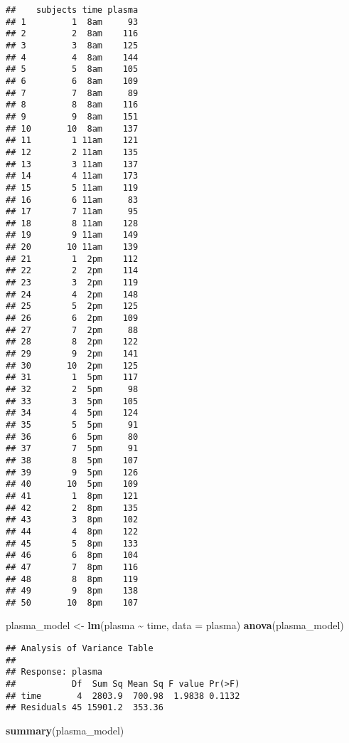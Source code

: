 \documentclass[
]{article}
\newenvironment{Shaded}{\begin{snugshade}}{\end{snugshade}}
\newcommand{\AttributeTok}[1]{\textcolor[rgb]{0.13,0.29,0.53}{#1}}
\newcommand{\FunctionTok}[1]{\textcolor[rgb]{0.13,0.29,0.53}{\textbf{#1}}}
\newcommand{\NormalTok}[1]{#1}
\newcommand{\OtherTok}[1]{\textcolor[rgb]{0.56,0.35,0.01}{#1}}
\newcommand{\SpecialCharTok}[1]{\textcolor[rgb]{0.81,0.36,0.00}{\textbf{#1}}}
\begin{document}
\begin{verbatim}
##    subjects time plasma
## 1         1  8am     93
## 2         2  8am    116
## 3         3  8am    125
## 4         4  8am    144
## 5         5  8am    105
## 6         6  8am    109
## 7         7  8am     89
## 8         8  8am    116
## 9         9  8am    151
## 10       10  8am    137
## 11        1 11am    121
## 12        2 11am    135
## 13        3 11am    137
## 14        4 11am    173
## 15        5 11am    119
## 16        6 11am     83
## 17        7 11am     95
## 18        8 11am    128
## 19        9 11am    149
## 20       10 11am    139
## 21        1  2pm    112
## 22        2  2pm    114
## 23        3  2pm    119
## 24        4  2pm    148
## 25        5  2pm    125
## 26        6  2pm    109
## 27        7  2pm     88
## 28        8  2pm    122
## 29        9  2pm    141
## 30       10  2pm    125
## 31        1  5pm    117
## 32        2  5pm     98
## 33        3  5pm    105
## 34        4  5pm    124
## 35        5  5pm     91
## 36        6  5pm     80
## 37        7  5pm     91
## 38        8  5pm    107
## 39        9  5pm    126
## 40       10  5pm    109
## 41        1  8pm    121
## 42        2  8pm    135
## 43        3  8pm    102
## 44        4  8pm    122
## 45        5  8pm    133
## 46        6  8pm    104
## 47        7  8pm    116
## 48        8  8pm    119
## 49        9  8pm    138
## 50       10  8pm    107
\end{verbatim}

\begin{Shaded}
\begin{Highlighting}[]
\NormalTok{plasma\_model }\OtherTok{\textless{}{-}} \FunctionTok{lm}\NormalTok{(plasma }\SpecialCharTok{\textasciitilde{}}\NormalTok{ time, }\AttributeTok{data =}\NormalTok{ plasma)}
\FunctionTok{anova}\NormalTok{(plasma\_model)}
\end{Highlighting}
\end{Shaded}

\begin{verbatim}
## Analysis of Variance Table
## 
## Response: plasma
##           Df  Sum Sq Mean Sq F value Pr(>F)
## time       4  2803.9  700.98  1.9838 0.1132
## Residuals 45 15901.2  353.36
\end{verbatim}

\begin{Shaded}
\begin{Highlighting}[]
\FunctionTok{summary}\NormalTok{(plasma\_model)}
\end{Highlighting}
\end{Shaded}
\end{document}
